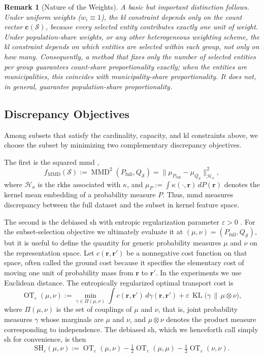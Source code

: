 \documentclass[10pt,journal]{IEEEtran}
\newcommand{\1}{\mathbf{1}}
\newcommand{\br}{\mathbf{r}}
\newcommand{\bc}{\mathbf{c}}
\newcommand{\Sel}{\mathcal{S}}
\newcommand{\Full}{\mathrm{full}}
\newcommand{\SH}{\mathrm{SH}}
\DeclareMathOperator{\KL}{KL}
\DeclareMathOperator{\MMD}{MMD}
\DeclareMathOperator{\OT}{OT}
\theoremstyle{ieeethm}
\newtheorem{remark}{Remark}
\begin{document}
\begin{remark}[Nature of the Weights]
A basic but important distinction follows. Under uniform weights ($w_i\equiv 1$), the \gls{kl} constraint depends only on the count vector $\bc(\Sel)$, because every selected entity contributes exactly one unit of weight. Under population-share weights, or any other heterogeneous weighting scheme, the \gls{kl} constraint depends on which entities are selected within each group, not only on how many. Consequently, a method that fixes only the number of selected entities per group guarantees count-share proportionality exactly; when the entities are municipalities, this coincides with municipality-share proportionality. It does not, in general, guarantee population-share proportionality.
\end{remark}

\subsection{Discrepancy Objectives}
\label{subsec:objectives}

Among subsets that satisfy the cardinality, capacity, and \gls{kl} constraints above, we choose the subset by minimizing two complementary discrepancy objectives.

The first is the squared \gls{mmd} \cite{gretton2012kernel},
\[
f_{\mathrm{MMD}}(\Sel)
:=
\MMD^2(P_{\Full},Q_{\Sel})
=
\|\mu_{P_{\Full}}-\mu_{Q_{\Sel}}\|_{\mathcal{H}_\kappa}^2,
\]
where $\mathcal{H}_\kappa$ is the \gls{rkhs} associated with $\kappa$, and $\mu_P:=\int \kappa(\cdot,\br)\,dP(\br)$ denotes the kernel mean embedding of a probability measure $P$. Thus, \gls{mmd} measures discrepancy between the full dataset and the subset in kernel feature space.

The second is the debiased \gls{sh} with entropic regularization parameter $\varepsilon>0$ \cite{cuturi2013sinkhorn,feydy2019sinkhorn}. For the subset-selection objective we ultimately evaluate it at $(\mu,\nu)=(P_{\Full},Q_{\Sel})$, but it is useful to define the quantity for generic probability measures $\mu$ and $\nu$ on the representation space. Let $c(\br,\br')$ be a nonnegative cost function on that space, often called the ground cost because it specifies the elementary cost of moving one unit of probability mass from $\br$ to $\br'$. In the experiments we use Euclidean distance. The entropically regularized optimal transport cost is
\[
\OT_{\varepsilon}(\mu,\nu)
:=
\min_{\gamma\in\Pi(\mu,\nu)}
\int c(\br,\br')\,d\gamma(\br,\br')
+
\varepsilon\,\KL\!\big(\gamma\,\big\|\,\mu\otimes\nu\big),
\]
where $\Pi(\mu,\nu)$ is the set of couplings of $\mu$ and $\nu$, that is, joint probability measures $\gamma$ whose marginals are $\mu$ and $\nu$, and $\mu\otimes\nu$ denotes the product measure corresponding to independence. The debiased \gls{sh}, which we henceforth call simply \gls{sh} for convenience, is then
\begin{equation*}
\SH_{\varepsilon}(\mu,\nu)
:=
\OT_{\varepsilon}(\mu,\nu)
-\tfrac12\OT_{\varepsilon}(\mu,\mu)
-\tfrac12\OT_{\varepsilon}(\nu,\nu).
\end{equation*}
\end{document}
